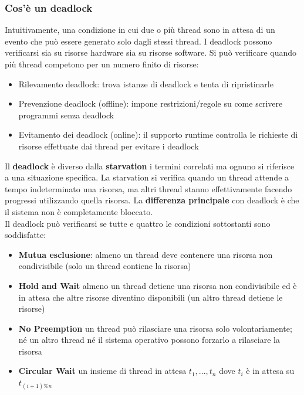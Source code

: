 \documentclass{article}
\begin{document}
\subsubsection{Cos'è un deadlock}
Intuitivamente, una condizione in cui due o più thread sono in attesa di un evento che può essere generato solo dagli stessi thread. I deadlock possono verificarsi sia su risorse hardware sia su risorse software. Si può verificare quando più thread competono per un numero finito di risorse:
\begin{itemize} 
    \item Rilevamento deadlock: trova istanze di deadlock e tenta di ripristinarle
    \item Prevenzione deadlock (offline): impone restrizioni/regole su come scrivere
    programmi senza deadlock
    \item Evitamento dei deadlock (online): il supporto runtime controlla le richieste di risorse effettuate dai thread per evitare i deadlock
\end{itemize}
Il \textbf{deadlock} è diverso dalla \textbf{starvation} i termini correlati ma ognuno si riferisce a una situazione specifica. La starvation si verifica quando un thread attende a tempo indeterminato una risorsa, ma altri thread stanno effettivamente facendo progressi utilizzando quella risorsa. La \textbf{differenza principale} con deadlock è che il sistema non è completamente bloccato. \\

Il deadlock può verificarsi se tutte e quattro le condizioni sottostanti sono soddisfatte:
\begin{itemize}
    \item \textbf{Mutua esclusione}: almeno un thread deve contenere una risorsa non condivisibile (solo
    un thread contiene la risorsa)
    \item \textbf{Hold and Wait} almeno un thread detiene una risorsa non condivisibile ed è in attesa che altre risorse diventino disponibili (un altro thread detiene le risorse)
    \item \textbf{No Preemption} un thread può rilasciare una risorsa solo volontariamente; né un altro thread né il sistema operativo possono forzarlo a rilasciare la risorsa
    \item \textbf{Circular Wait} un insieme di thread in attesa $t_{1}, ..., t_{n}$ dove $t_{i}$ è in attesa su $t_{(i+1)\%n}$
\end{itemize}
\end{document}
